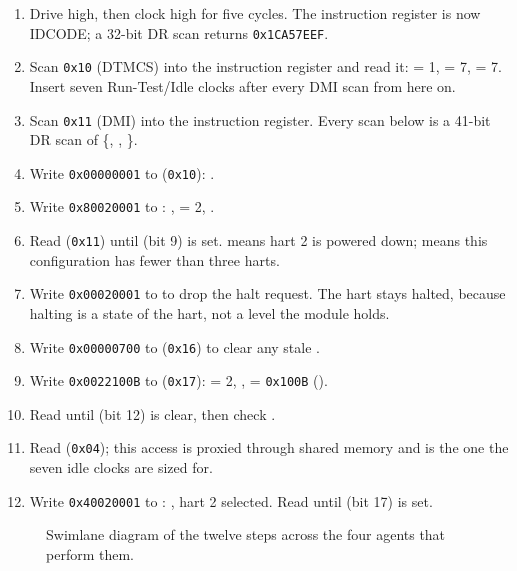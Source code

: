 \begin{enumerate}
	\item Drive  high, then clock  high for five  cycles. The instruction register is now IDCODE; a 32-bit DR scan returns \texttt{0x1CA57EEF}.
	\item Scan \texttt{0x10} (DTMCS) into the instruction register and read it:  = 1,  = 7,  = 7. Insert seven Run-Test/Idle clocks after every DMI scan from here on.
	\item Scan \texttt{0x11} (DMI) into the instruction register. Every scan below is a 41-bit DR scan of \{, , \}.
	\item Write \texttt{0x00000001} to  (\texttt{0x10}): .
	\item Write \texttt{0x80020001} to : ,  = 2, .
	\item Read  (\texttt{0x11}) until  (bit 9) is set.  means hart 2 is powered down;  means this configuration has fewer than three harts.
	\item Write \texttt{0x00020001} to  to drop the halt request. The hart stays halted, because halting is a state of the hart, not a level the module holds.
	\item Write \texttt{0x00000700} to  (\texttt{0x16}) to clear any stale .
	\item Write \texttt{0x0022100B} to  (\texttt{0x17}):  = 2, ,  = \texttt{0x100B} ().
	\item Read  until  (bit 12) is clear, then check .
	\item Read  (\texttt{0x04}); this access is proxied through shared memory and is the one the seven idle clocks are sized for.
	\item Write \texttt{0x40020001} to : , hart 2 selected. Read  until  (bit 17) is set.
\end{enumerate}

\begin{figure}[htpb]
	\centering
	
	\caption{Swimlane diagram of the twelve steps across the four agents that perform them.}
	\label{fig:debug-swimlane}
\end{figure}


